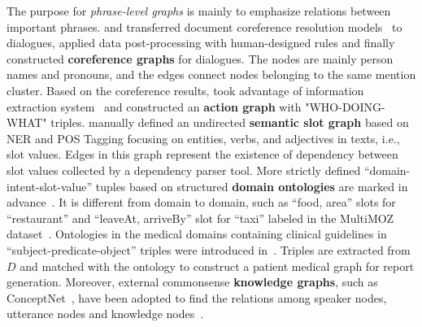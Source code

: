 The purpose for \textit{phrase-level graphs} is mainly to emphasize relations between important phrases.
\citet{liu2021coreference} and \citet{liu2021controllable} transferred document coreference resolution models~\cite{joshi2020spanbert,lee2018higher} to dialogues,  applied data post-processing with human-designed rules and finally constructed \textbf{coreference graphs} for dialogues. The nodes are mainly person names and pronouns, and the edges connect nodes belonging to the same mention cluster.
Based on the coreference results, \citet{chen2021structure} took advantage of information extraction system~\cite{angeli2015leveraging} and constructed an \textbf{action graph} with "WHO-DOING-WHAT" triples. 
\citet{zhao2021give} manually defined an undirected \textbf{semantic slot graph} based on NER and POS Tagging focusing on entities, verbs, and adjectives in texts, i.e., slot values. Edges in this graph represent the existence of dependency between slot values collected by a dependency parser tool.
More strictly defined ``domain-intent-slot-value'' tuples based on structured \textbf{domain ontologies} are marked in advance~\cite{yuan2019scaffolds,zhao2021todsum}. It is different from domain to domain, such as ``food, area'' slots 
for ``restaurant'' and ``leaveAt, arriveBy'' slot for ``taxi'' labeled in 
the MultiMOZ dataset~\cite{eric2019multiwoz}.
Ontologies in the medical domains containing clinical guidelines in 
``subject-predicate-object'' triples were introduced in~\citet{molennar2020healthcare}. Triples are extracted from $D$ and matched with the ontology to construct a patient medical graph for report generation.
Moreover, external commonsense \textbf{knowledge graphs}, 
such as ConceptNet~\cite{speer2012representing}, have been adopted to find the relations among speaker nodes, utterance nodes and knowledge nodes~\cite{feng2021incorporating}. 



